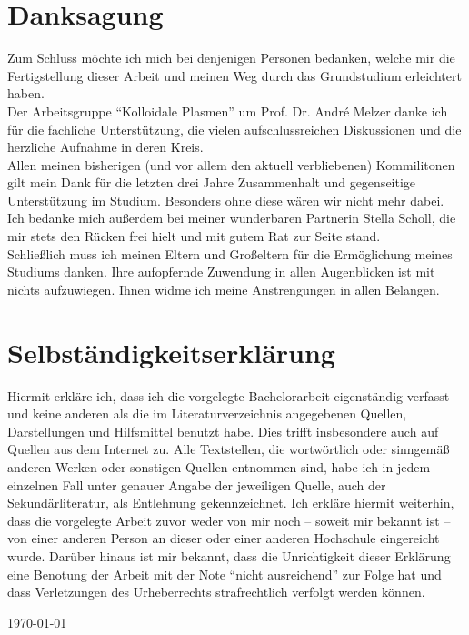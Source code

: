	\chapter*{Danksagung}
		\thispagestyle{empty}

		Zum Schluss möchte ich mich bei denjenigen Personen bedanken, welche mir die Fertigstellung dieser Arbeit und meinen Weg durch das Grundstudium erleichtert haben.\\
		Der Arbeitsgruppe "`Kolloidale Plasmen"' um Prof. Dr. André Melzer danke ich für die fachliche Unterstützung, die vielen aufschlussreichen Diskussionen und die herzliche Aufnahme in deren Kreis. \\
		Allen meinen bisherigen (und vor allem den aktuell verbliebenen) Kommilitonen gilt mein Dank für die letzten drei Jahre Zusammenhalt und gegenseitige Unterstützung im Studium. Besonders ohne diese wären wir nicht mehr dabei.\\
		Ich bedanke mich außerdem bei meiner wunderbaren Partnerin Stella Scholl, die mir stets den Rücken frei hielt und mit gutem Rat zur Seite stand.\\
		Schließlich muss ich meinen Eltern und Großeltern für die Ermöglichung meines Studiums danken. Ihre aufopfernde Zuwendung in allen Augenblicken ist mit nichts aufzuwiegen. Ihnen widme ich meine Anstrengungen in allen Belangen.

	\chapter*{Selbständigkeitserklärung}
		\thispagestyle{empty}

	Hiermit erkläre ich, dass ich die vorgelegte Bachelorarbeit eigenständig verfasst und keine anderen als die im Literaturverzeichnis angegebenen Quellen, Darstellungen und Hilfsmittel benutzt habe. Dies trifft insbesondere auch auf Quellen aus dem Internet zu. Alle Textstellen, die wortwörtlich oder sinngemäß anderen Werken oder sonstigen Quellen entnommen sind, habe ich in jedem einzelnen Fall unter genauer Angabe der jeweiligen Quelle, auch der Sekundärliteratur, als Entlehnung gekennzeichnet. Ich erkläre hiermit weiterhin, dass die vorgelegte Arbeit zuvor weder von mir noch – soweit mir bekannt ist – von einer anderen Person an dieser oder einer anderen Hochschule eingereicht wurde. Darüber hinaus ist mir bekannt, dass die Unrichtigkeit dieser Erklärung eine Benotung der Arbeit mit der Note "`nicht ausreichend"' zur Folge hat und dass Verletzungen des Urheberrechts strafrechtlich verfolgt werden können.

		\vspace{3cm}

	\begin{flushright}
		 \today
	\end{flushright}

